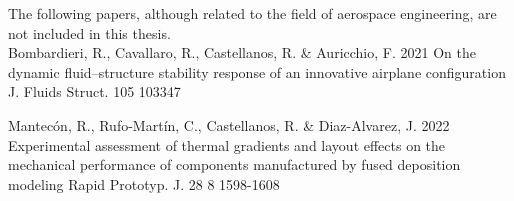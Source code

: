 The following papers, although related to the field of aerospace engineering, are not included in this thesis.\\

  \paperitem%
    {Bombardieri, R., Cavallaro, R., Castellanos, R. \& Auricchio, F.}%
    {2021}%
    {On the dynamic fluid–structure stability response of an innovative airplane configuration}%
    {J. Fluids Struct.}%
    {105}%
    {}%
    {103347}%

\vspace{0.3cm}

	\paperitem%
		{Mantec{\'o}n, R., Rufo-Mart{\'i}n, C., Castellanos, R. \& Diaz-Alvarez, J.}%
		{2022}%
		{Experimental assessment of thermal gradients and layout effects on the mechanical performance of components manufactured by fused deposition modeling}%
		{Rapid Prototyp. J.}%
		{28}%
		{8}%
		{1598-1608}%